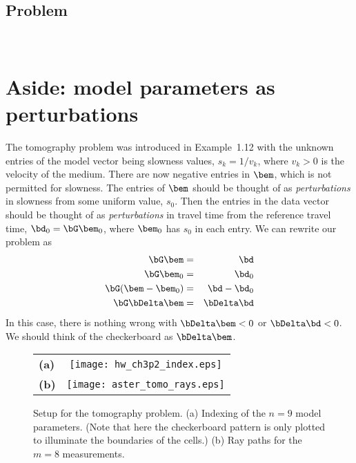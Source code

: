 \documentclass[11pt,titlepage,fleqn]{article}
\begin{document}

\subsection*{Problem} \howmuchtime\

\pagebreak

\nocite{AsterE2}



\appendix

\section{Aside: model parameters as perturbations}
\label{sec:pert}

The tomography problem was introduced in Example~1.12 with the unknown entries of the model vector being slowness values, $s_k = 1/v_k$, where $v_k > 0$ is the velocity of the medium. There are now negative entries in $\bem$, which is not permitted for slowness. The entries of $\bem$ should be thought of as {\em perturbations} in slowness from some uniform value, $s_0$. Then the entries in the data vector should be thought of as {\em perturbations} in travel time from the reference travel time, $\bd_0 = \bG\bem_0$, where $\bem_0$ has $s_0$ in each entry. We can rewrite our problem as
%
\begin{eqnarray}
\bG\bem &=& \bd
\\
\bG\bem_0 &=& \bd_0
\\
\bG(\bem - \bem_0) &=& \bd - \bd_0
\\
\bG\bDelta\bem &=& \bDelta\bd
\end{eqnarray}
%
In this case, there is nothing wrong with $\bDelta\bem < 0$ or $\bDelta\bd < 0$. We should think of the checkerboard as $\bDelta\bem$.



\begin{figure}[h]
\centering
\begin{tabular}{lc}
{\bf(a)} & \texttt{[image: hw\_ch3p2\_index.eps]} \\
{\bf(b)} & \texttt{[image: aster\_tomo\_rays.eps]} \\
\end{tabular}
\caption[]
{{
Setup for the tomography problem.
(a) Indexing of the $n=9$ model parameters.
(Note that here the checkerboard pattern is only plotted to illuminate the boundaries of the cells.)
(b) Ray paths for the $m=8$ measurements.
\label{fig:index}
}}
\end{figure} 


\end{document}

